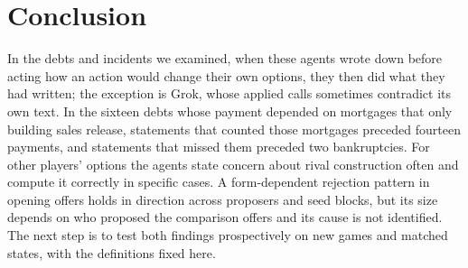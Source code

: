 \section{Conclusion}
In the debts and incidents we examined, when these agents wrote down before acting how an action would change their own options, they then did what they had written; the exception is Grok, whose applied calls sometimes contradict its own text. In the sixteen debts whose payment depended on mortgages that only building sales release, statements that counted those mortgages preceded fourteen payments, and statements that missed them preceded two bankruptcies. For other players' options the agents state concern about rival construction often and compute it correctly in specific cases. A form-dependent rejection pattern in opening offers holds in direction across proposers and seed blocks, but its size depends on who proposed the comparison offers and its cause is not identified. The next step is to test both findings prospectively on new games and matched states, with the definitions fixed here.
